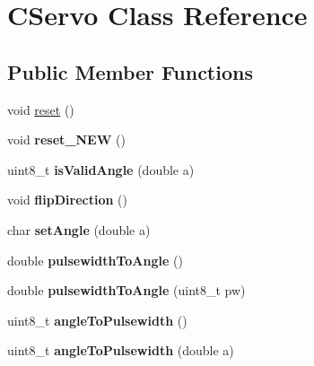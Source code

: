 \hypertarget{class_c_servo}{
\section{CServo Class Reference}
\label{class_c_servo}
}
\subsection*{Public Member Functions}
\begin{DoxyCompactItemize}
\item 
void \hyperlink{class_c_servo_a4ca4bca66566dcb5c05edc85ab7a229c}{reset} ()
\item 
\hypertarget{class_c_servo_a3bc6713beb1aab1224a0f7a98deb4667}{
void {\bfseries reset\_\-NEW} ()}
\label{class_c_servo_a3bc6713beb1aab1224a0f7a98deb4667}

\item 
\hypertarget{class_c_servo_a087275a1e13fc08af3ce2787f8a6110f}{
uint8\_\-t {\bfseries isValidAngle} (double a)}
\label{class_c_servo_a087275a1e13fc08af3ce2787f8a6110f}

\item 
\hypertarget{class_c_servo_a1fc7088c5c1391663f5fa0955610c4cf}{
void {\bfseries flipDirection} ()}
\label{class_c_servo_a1fc7088c5c1391663f5fa0955610c4cf}

\item 
\hypertarget{class_c_servo_a2a741c0660adf140ca38885e5c4dd7d1}{
char {\bfseries setAngle} (double a)}
\label{class_c_servo_a2a741c0660adf140ca38885e5c4dd7d1}

\item 
\hypertarget{class_c_servo_a5d1af102654eab2e5fbaae2527e51323}{
double {\bfseries pulsewidthToAngle} ()}
\label{class_c_servo_a5d1af102654eab2e5fbaae2527e51323}

\item 
\hypertarget{class_c_servo_acba030bc908615259e3e4e96c8c0b282}{
double {\bfseries pulsewidthToAngle} (uint8\_\-t pw)}
\label{class_c_servo_acba030bc908615259e3e4e96c8c0b282}

\item 
\hypertarget{class_c_servo_ac9a9b126f18ece14cfca0a7791d0ca26}{
uint8\_\-t {\bfseries angleToPulsewidth} ()}
\label{class_c_servo_ac9a9b126f18ece14cfca0a7791d0ca26}

\item 
\hypertarget{class_c_servo_a3ba66ebf5d540d6ab1fe0d8e9746b45a}{
uint8\_\-t {\bfseries angleToPulsewidth} (double a)}
\label{class_c_servo_a3ba66ebf5d540d6ab1fe0d8e9746b45a}

\end{DoxyCompactItemize}
